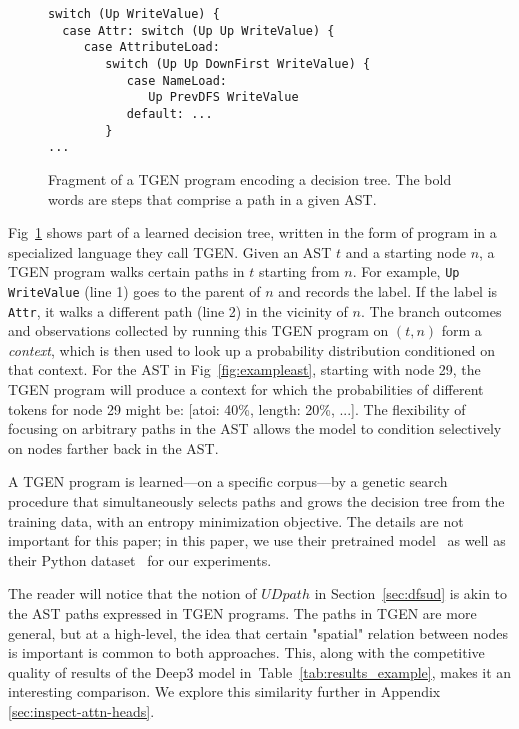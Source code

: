 \documentclass[nonacm, sigconf]{acmart}
\newcommand{\tabref}[1]{Table~\ref{#1}}
\begin{document}
\begin{figure}
\lstset{basicstyle=\footnotesize\ttfamily}
\begin{lstlisting}
switch (Up WriteValue) {
  case Attr: switch (Up Up WriteValue) {
     case AttributeLoad: 
        switch (Up Up DownFirst WriteValue) {
           case NameLoad:
              Up PrevDFS WriteValue
           default: ...
        }
...
\end{lstlisting}
    \caption{Fragment of a TGEN program encoding a decision tree. The bold words are steps that comprise a path in a given AST.}
    \label{fig:deep3}
\end{figure}

Fig~\ref{fig:deep3} shows part of a learned decision tree, written in the form of program in a specialized language they call TGEN.  Given an AST $t$ and a starting node $n$, a TGEN program walks certain paths in $t$ starting from $n$. For example, \texttt{Up WriteValue} (line 1) goes to the parent of $n$ and records the label. If the label is \texttt{Attr}, it walks a different path (line 2) in the vicinity of $n$.  The branch outcomes and observations collected by running this TGEN program on $(t,n)$ form a \emph{context}, which is then used to look up a probability distribution conditioned on that context. For the AST in Fig~\ref{fig:exampleast}, starting with node 29, the TGEN program will produce a context for which the probabilities of different tokens for node 29 might be: [atoi: 40\%, length: 20\%, ...].  The flexibility of focusing on arbitrary paths in the AST allows the model to condition selectively on nodes farther back in the AST.

A TGEN program is learned---on a specific corpus---by a genetic search procedure that simultaneously selects paths and grows the decision tree from the training data, with an entropy minimization objective. The details are not important for this paper;
in this paper, we use their pretrained model~\cite{phog} as well as their Python dataset~\cite{py150} for our experiments.


The reader will notice that the notion of $\mathit{UDpath}$ in Section~\ref{sec:dfsud} is  akin to the AST paths expressed in TGEN programs. The paths in TGEN are more general, but at a high-level, the idea that certain "spatial" relation between nodes is important is common to both approaches. This, along with the competitive quality of results of the Deep3 model in~\tabref{tab:results_example}, makes it an interesting comparison. We explore this similarity further in Appendix \ref{sec:inspect-attn-heads}.
\end{document}
